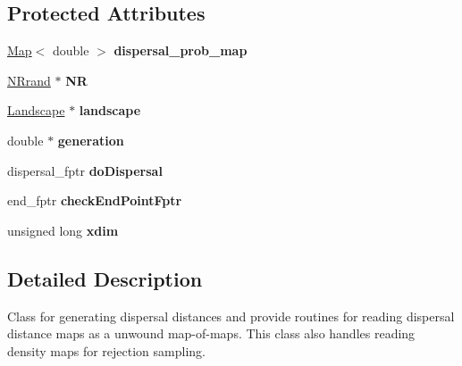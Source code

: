 \subsection*{Protected Attributes}
\begin{DoxyCompactItemize}
\item 
\hyperlink{class_map}{Map}$<$ double $>$ {\bfseries dispersal\+\_\+prob\+\_\+map}\hypertarget{class_dispersal_coordinator_ac840e1b9b3da20c131137c2801754d87}{}\label{class_dispersal_coordinator_ac840e1b9b3da20c131137c2801754d87}

\item 
\hyperlink{class_n_rrand}{N\+Rrand} $\ast$ {\bfseries NR}\hypertarget{class_dispersal_coordinator_ac4c17447257ed00e1b5610e0e35a5443}{}\label{class_dispersal_coordinator_ac4c17447257ed00e1b5610e0e35a5443}

\item 
\hyperlink{class_landscape}{Landscape} $\ast$ {\bfseries landscape}\hypertarget{class_dispersal_coordinator_a316f067e84937650316f47b219e2cb76}{}\label{class_dispersal_coordinator_a316f067e84937650316f47b219e2cb76}

\item 
double $\ast$ {\bfseries generation}\hypertarget{class_dispersal_coordinator_ae3f83d100dad7c60137edf42b3c199c1}{}\label{class_dispersal_coordinator_ae3f83d100dad7c60137edf42b3c199c1}

\item 
dispersal\+\_\+fptr {\bfseries do\+Dispersal}\hypertarget{class_dispersal_coordinator_a93262d2bb612108bfcdc56c1ba11bad1}{}\label{class_dispersal_coordinator_a93262d2bb612108bfcdc56c1ba11bad1}

\item 
end\+\_\+fptr {\bfseries check\+End\+Point\+Fptr}\hypertarget{class_dispersal_coordinator_a1612005c176cd769797a4d4e459e2dec}{}\label{class_dispersal_coordinator_a1612005c176cd769797a4d4e459e2dec}

\item 
unsigned long {\bfseries xdim}\hypertarget{class_dispersal_coordinator_a66668e6ceec55afa61c1e99719bc6146}{}\label{class_dispersal_coordinator_a66668e6ceec55afa61c1e99719bc6146}

\end{DoxyCompactItemize}


\subsection{Detailed Description}
Class for generating dispersal distances and provide routines for reading dispersal distance maps as a unwound map-\/of-\/maps. This class also handles reading density maps for rejection sampling. 

